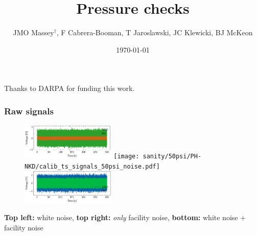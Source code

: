 \documentclass[aspectratio=169,9pt]{beamer}
\title{Pressure checks}
\author{JMO Massey$^{\dag}$, F Cabrera-Booman, T Jaroslawski, JC Klewicki, BJ McKeon}
\institute{Center for Turbulence Research \\ Stanford University}
\date{\today}
\begin{document}
\begin{frame}
    \setcounter{framenumber}{0}
    \titlepage
    \vfill
    {\scriptsize \centering Thanks to DARPA for funding this work.\par}
\end{frame}


\begin{frame}
  \frametitle{Raw signals}
  \begin{figure}
    \centering
    \includegraphics[width=0.4\textwidth]{sanity/50psi/PH-NKD/calib_ts_signals_50psi_nonoise.pdf}
    \texttt{[image: sanity/50psi/PH-NKD/calib\_ts\_signals\_50psi\_noise.pdf]}
    \includegraphics[width=0.4\textwidth]{sanity/50psi/PH-NKD/calib_ts_signals_50psi_noiseWN.pdf}
  \end{figure}
  \centering
  \textbf{Top left:} white noise, \textbf{top right:} \emph{only} facility noise, \textbf{bottom:} white noise + facility noise
\end{frame}
\end{document}
